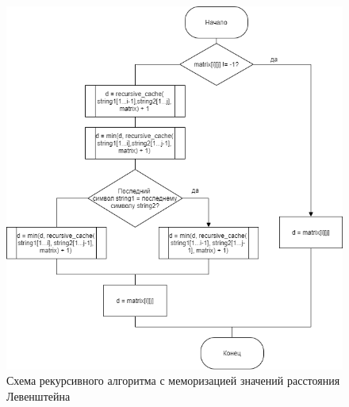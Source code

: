 \documentclass[12pt]{report}
\begin{document}
\begin{figure}[hp!]
	\centering
	\includegraphics[scale=0.8]{report_files/memorize_recursive_levenshtein.png}
	\caption{Схема рекурсивного алгоритма с меморизацией значений расстояния Левенштейна}
	\label{fig:mpr}
\end{figure}
\end{document}
